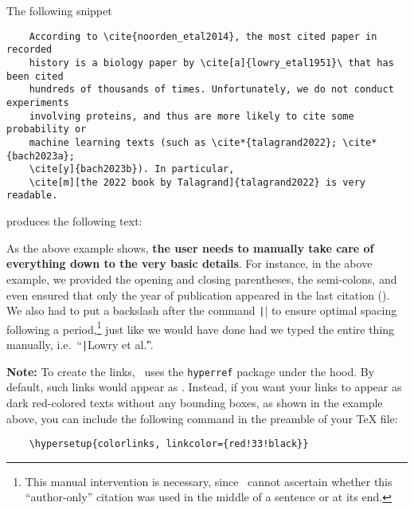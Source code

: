 \documentclass[letter, 11pt]{article}
\begin{document}
  The following snippet
  \begin{verbatim}
    According to \cite{noorden_etal2014}, the most cited paper in recorded
    history is a biology paper by \cite[a]{lowry_etal1951}\ that has been cited
    hundreds of thousands of times. Unfortunately, we do not conduct experiments
    involving proteins, and thus are more likely to cite some probability or
    machine learning texts (such as \cite*{talagrand2022}; \cite*{bach2023a};
    \cite[y]{bach2023b}). In particular,
    \cite[m][the 2022 book by Talagrand]{talagrand2022} is very readable.
  \end{verbatim}
  produces the following text:
  \begin{center}
  \end{center}
  
  As the above example shows, \textbf{the user needs to manually take care of everything down to the very basic details}. For instance, in the above example, we provided the opening and closing parentheses, the semi-colons, and even ensured that only the year of publication appeared in the last citation (\cite*{bach2023b}). We also had to put a backslash after the command \texttt|\cite[a]{lowry_etal1951}| to ensure optimal spacing following a period,\footnote{This manual intervention is necessary, since \dumbib\ cannot ascertain whether this ``author-only'' citation was used in the middle of a sentence or at its end.} just like we would have done had we typed the entire thing manually, i.e.\ ``\texttt|Lowry et al.\|''.

  \noindent \textbf{Note:}  To create the links, \dumbib\ uses the \texttt{hyperref} package under the hood. By default, such links would appear as . Instead, if you want your links to appear as dark red-colored texts without any bounding boxes, as shown in the example above, you can include the following command in the preamble of your \TeX{} file:
  \begin{verbatim}
    \hypersetup{colorlinks, linkcolor={red!33!black}}
  \end{verbatim}
\end{document}
